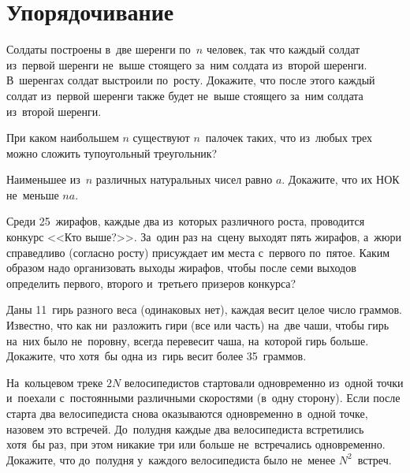 
\section*{Упорядочивание}


\begin{problems}

\item
Солдаты построены в~две шеренги по~$n$ человек, так что каждый солдат из~первой
шеренги не~выше стоящего за~ним солдата из~второй шеренги.
В~шеренгах солдат выстроили по~росту.
Докажите, что после этого каждый солдат из~первой шеренги также будет не~выше
стоящего за~ним солдата из~второй шеренги.

\item
При каком наибольшем $n$ существуют $n$~палочек таких, что из~любых трех можно
сложить тупоугольный треугольник?

\item
Наименьшее из~$n$ различных натуральных чисел равно $a$.
Докажите, что их НОК не~меньше $n a$.

\item
Среди 25~жирафов, каждые два из~которых различного роста, проводится конкурс
<<Кто выше?>>.
За~один раз на~сцену выходят пять жирафов, а~жюри справедливо (согласно росту)
присуждает им места с~первого по~пятое.
Каким образом надо организовать выходы жирафов, чтобы после семи выходов
определить первого, второго и~третьего призеров конкурса?

\item
Даны 11~гирь разного веса (одинаковых нет), каждая весит целое число граммов.
Известно, что как ни~разложить гири (все или часть) на~две чаши, чтобы гирь
на~них было не~поровну, всегда перевесит чаша, на~которой гирь больше.
Докажите, что хотя~бы одна из~гирь весит более 35~граммов.

\item
На~кольцевом треке $2 N$ велосипедистов стартовали одновременно из~одной точки
и~поехали с~постоянными различными скоростями (в~одну сторону).
Если после старта два велосипедиста снова оказываются одновременно в~одной
точке, назовем это встречей.
До~полудня каждые два велосипедиста встретились хотя~бы раз, при этом никакие
три или больше не~встречались одновременно.
Докажите, что до~полудня у~каждого велосипедиста было не~менее $N^2$~встреч.


\end{problems}
